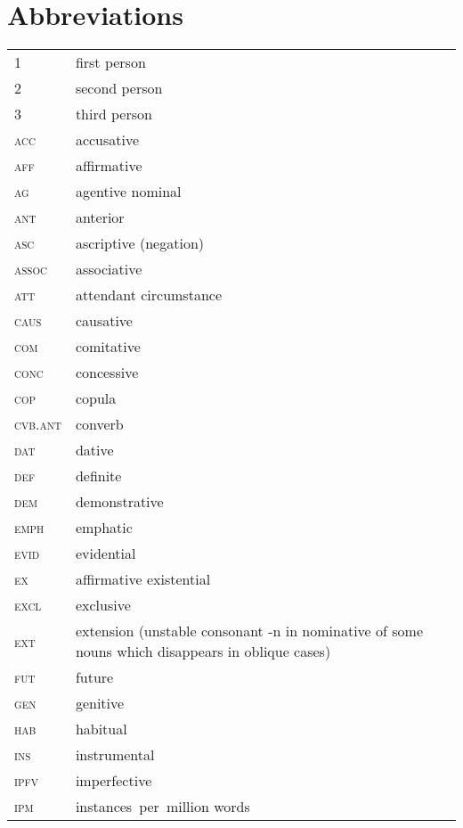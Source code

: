 \documentclass[output=paper]{langsci/langscibook}
\begin{document}
\section*{Abbreviations}
\begin{tabularx}{.45\textwidth}{lQ}
1				&first person\\
2 				&second person\\
3 				&third person\\
    \textsc{acc} & accusative\\
    \textsc{aff} & affirmative\\
    \textsc{ag} & agentive nominal\\
    \textsc{ant} & anterior\\
    \textsc{asc} & ascriptive (negation)\\
    \textsc{assoc} & associative\\
    \textsc{att} & attendant circumstance\\
    \textsc{caus} & causative\\
    \textsc{com} & comitative\\
    \textsc{conc} & concessive\\
    \textsc{cop} & copula\\
    \textsc{cvb.ant} & converb\\
    \textsc{dat} & dative\\
    \textsc{def} & definite\\
    \textsc{dem} & demonstrative\\
    \textsc{emph} & emphatic\\
    \textsc{evid} & evidential\\
    \textsc{ex} & affirmative existential\\
    \textsc{excl} & exclusive\\
    \textsc{ext} & extension (unstable consonant -n in nominative of some nouns which disappears in oblique cases)\\
    \textsc{fut} & future\\
    \textsc{gen} & genitive\\
    \textsc{hab} & habitual\\
    \textsc{ins} & instrumental\\
    \textsc{ipfv} & imperfective\\
    \textsc{ipm} & instances per million words\\
\end{tabularx}
\end{document}
